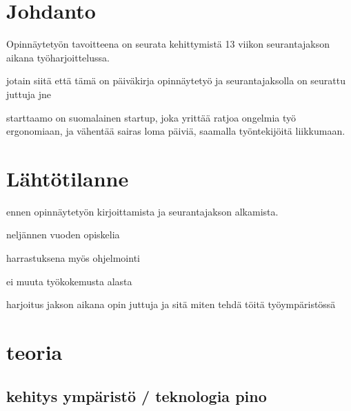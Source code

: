 \documentclass[11pt,a4paper,titlepage,oneside]{article}
\begin{document}
\pagestyle{fancy}
\lfoot{}
\cfoot{}
\rfoot{}
\lhead{}
\chead{}
\rhead{\thepage}
\renewcommand{\headrulewidth}{0pt}
\renewcommand{\footrulewidth}{0pt}


\section{Johdanto}              %


Opinnäytetyön tavoitteena on seurata kehittymistä 13 viikon seurantajakson aikana työharjoittelussa.
\medskip

jotain siitä että tämä on päiväkirja opinnäytetyö
ja seurantajaksolla on seurattu juttuja jne
\medskip

starttaamo on suomalainen startup, joka yrittää ratjoa ongelmia työ ergonomiaan, ja vähentää sairas loma päiviä, saamalla työntekijöitä liikkumaan.
\medskip






\newpage
\section{Lähtötilanne}         %


ennen opinnäytetyön kirjoittamista ja seurantajakson alkamista. 

neljännen vuoden opiskelia

harrastuksena myös ohjelmointi

ei muuta työkokemusta alasta
\medskip

harjoitus jakson aikana opin juttuja ja sitä miten tehdä töitä työympäristössä









\newpage
\section{teoria}                %



\subsection{kehitys ympäristö / teknologia pino}
\end{document}
